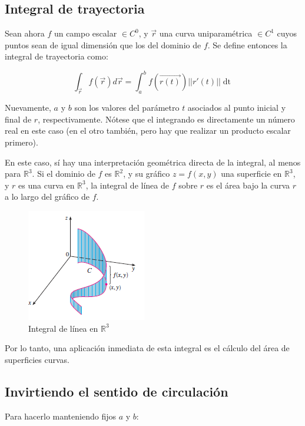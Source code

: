 \documentclass{article}
\renewcommand{\Bbb}{\mathbb}
\begin{document}
\subsection{Integral de trayectoria}

Sean ahora $f$ un campo escalar $\in C^0$, y $\overrightarrow{r}$ una curva uniparamétrica $\in C^1$ cuyos puntos sean de igual dimensión que los del dominio de $f$. Se define entonces la integral de trayectoria como:

\begin{equation}
\int_{\overrightarrow{r}} f(\overrightarrow{r}) d\overrightarrow{r} = \int_{a}^{b} f(\overrightarrow{r(t)}) ||r'(t)|| \mathop{dt}
\end{equation}

Nuevamente, $a$ y $b$ son los valores del parámetro $t$ asociados al punto inicial y final de $r$, respectivamente. Nótese que el integrando es directamente un número real en este caso (en el otro también, pero hay que realizar un producto escalar primero).

En este caso, sí hay una interpretación geométrica directa de la integral, al menos para $\Bbb R^3$. Si el dominio de $f$ es $\Bbb R^2$, y su gráfico $z = f(x,y)$ una superficie en $\Bbb R^3$, y $r$ es una curva en $\Bbb R^3$, la integral de línea de $f$ sobre $r$ es el área bajo la curva $r$ a lo largo del gráfico de $f$.

\begin{figure}[ht]
\caption{Integral de línea en $\Bbb R^3$}
\centering
\includegraphics[scale=0.6]{img/teo_fig012_li.png} 
\end{figure}

Por lo tanto, una aplicación inmediata de esta integral es el cálculo del área de superficies curvas.

\subsection{Invirtiendo el sentido de circulación}

Para hacerlo manteniendo fijos $a$ y $b$:
\end{document}
